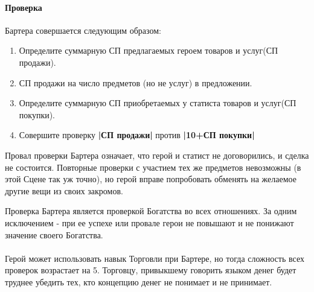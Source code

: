 \paragraph{Проверка} Бартера совершается следующим образом:
\begin{enumerate}
    \item Определите суммарную СП предлагаемых героем товаров и услуг(СП продажи).
    \item СП продажи на число предметов (но не услуг) в предложении.
    \item Определите суммарную СП приобретаемых у статиста товаров и услуг(СП покупки).
    \item Совершите проверку \textbf{|СП продажи|} против \textbf{|10+СП покупки|}
\end{enumerate}
Провал проверки Бартера означает, что герой и статист не договорились, и сделка не состоится. Повторные проверки с участием тех же предметов невозможны (в этой Сцене так уж точно), но герой вправе попробовать обменять на желаемое другие вещи из своих закромов.
\begin{tcolorbox}
    Проверка Бартера является проверкой Богатства во всех отношениях. За одним исключением - при ее успехе или провале герои не повышают и не понижают значение своего Богатства.
\end{tcolorbox}

\paragraph{}Герой может использовать навык Торговли при Бартере, но тогда сложность всех проверок возрастает на 5. Торговцу, привыкшему говорить языком денег будет труднее убедить тех, кто концепцию денег не понимает и не принимает.


